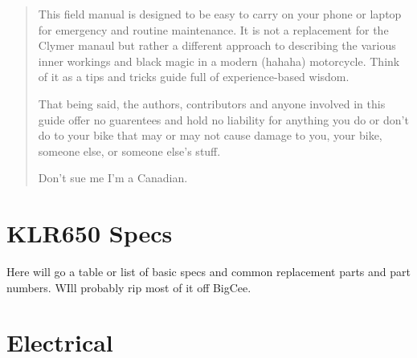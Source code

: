 \documentclass[12pt]{article}
\begin{document}
\maketitle

\begin{abstract}
	This field manual is designed to be easy to carry on your phone or laptop for emergency and routine maintenance. It is not a replacement for the Clymer manaul but rather a different approach to describing the various inner workings and black magic in a modern (hahaha) motorcycle. Think of it as a tips and tricks guide full of experience-based wisdom.
	
	That being said, the authors, contributors and anyone involved in this guide offer no guarentees and hold no liability for anything you do or don't do to your bike that may or may not cause damage to you, your bike, someone else, or someone else's stuff.
	
	Don't sue me I'm a Canadian.
\end{abstract}

\section{KLR650 Specs}
	Here will go a table or list of basic specs and common replacement parts and part numbers. WIll probably rip most of it off BigCee.
	
\section{Electrical}
	
	
	
\end{document}
